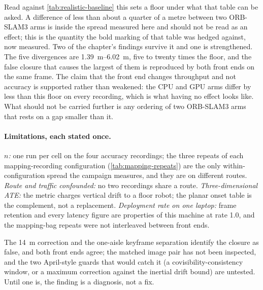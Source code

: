 \documentclass[11pt,a4paper,notitlepage]{report}
\begin{document}
Read against \cref{tab:realistic-baseline} this sets a floor under what that
table can be asked. A difference of less than about a quarter of a metre
between two ORB-SLAM3 arms is inside the spread measured here and should not be
read as an effect; this is the quantity the bold marking of that table was
hedged against, now measured. Two of the chapter's findings survive it and one
is strengthened. The five divergences are \SIrange{1.39}{6.02}{\metre}, five to
twenty times the floor, and the false closure that causes the largest of them
is reproduced by both front ends on the same frame. The claim that the front
end changes throughput and not accuracy is supported rather than weakened:
the CPU and GPU arms differ by less than this floor on every recording, which
is what having no effect looks like. What should not be carried further is any
ordering of two ORB-SLAM3 arms that rests on a gap smaller than it.


\paragraph{Limitations, each stated once.} \emph{$n$:} one run per cell on the
four accuracy recordings; the three repeats of each mapping-recording
configuration (\cref{tab:mapping-repeats}) are the only within-configuration
spread the campaign measures, and they are on different routes. \emph{Route and traffic confounded:} no two recordings
share a route. \emph{Three-dimensional ATE:} the metric charges vertical
drift to a floor robot; the planar onset table is the complement, not a
replacement. \emph{Deployment rate on one laptop:} frame retention and every latency
figure are properties of this machine at rate 1.0, and the mapping-bag
repeats were not interleaved between front ends.

\begin{queried}
The \SI{14}{\metre} correction and the one-aisle keyframe separation identify
the  closure as false, and both front ends agree; the
matched image pair has not been inspected, and the two April-style guards
that would catch it (a covisibility-consistency window, or a maximum
correction against the inertial drift bound) are untested. Until one is, the
finding is a diagnosis, not a fix.
\end{queried}
\end{document}
